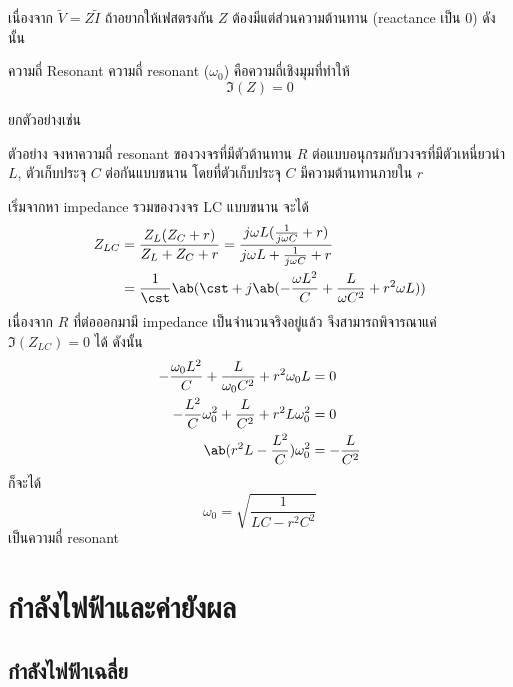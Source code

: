 เนื่องจาก $\tilde{V} = Z\tilde{I}$ ถ้าอยากให้เฟสตรงกัน $Z$ ต้องมีแต่ส่วนความต้านทาน (reactance เป็น 0) ดังนั้น
\begin{lawbox}{ความถี่ Resonant}
    ความถี่ resonant ($\omega_0$) คือความถี่เชิงมุมที่ทำให้
    \begin{equation*}
        \Im(Z) = 0
    \end{equation*}
\end{lawbox}
ยกตัวอย่างเช่น
\begin{corbox}{ตัวอย่าง}
    จงหาความถี่ resonant ของวงจรที่มีตัวต้านทาน $R$ ต่อแบบอนุกรมกับวงจรที่มีตัวเหนี่ยวนำ $L$, ตัวเก็บประจุ $C$ ต่อกันแบบขนาน โดยที่ตัวเก็บประจุ $C$ มีความต้านทานภายใน $r$
\end{corbox}
\begin{soln}
    เริ่มจากหา impedance รวมของวงจร LC แบบขนาน จะได้
    \begin{align*}
        Z_{LC} &= \frac{Z_L(Z_C + r)}{Z_L + Z_C + r} = \frac{j\omega L (\frac{1}{j\omega C} + r)}{j\omega L + \frac{1}{j\omega C} + r} \\
        &= \frac{1}{\cst}\ab(\cst + j\ab(-\frac{\omega L^2}{C} + \frac{L}{\omega C^2} + r^2\omega L)) 
    \end{align*}
    เนื่องจาก $R$ ที่ต่อออกมามี impedance เป็นจำนวนจริงอยู่แล้ว จึงสามารถพิจารณาแค่ $\Im(Z_{LC}) = 0$ ได้ ดังนั้น
    \begin{align*}
        -\frac{\omega_0 L^2}{C} + \frac{L}{\omega_0 C^2} + r^2\omega_0 L &= 0\\
        -\frac{L^2}{C}\omega_0^2 + \frac{L}{C^2} + r^2L\omega_0^2 &= 0\\
        \ab(r^2L - \frac{L^2}{C})\omega_0^2 &= -\frac{L}{C^2}
    \end{align*}
    ก็จะได้
    \[
    \omega_0 = \sqrt{\frac{1}{LC - r^2C^2}}
    \]
    เป็นความถี่ resonant
\end{soln}

\section{กำลังไฟฟ้าและค่ายังผล}

\subsection{กำลังไฟฟ้าเฉลี่ย}

